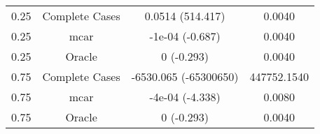 \begin{table}[ht]
\centering
\begin{tabular}{cccc}
  \hline
  \hline
0.25 & Complete Cases & 0.0514 (514.417) & 0.0040 \\ 
  0.25 & mcar & -1e-04 (-0.687) & 0.0040 \\ 
  0.25 & Oracle & 0 (-0.293) & 0.0040 \\ 
  0.75 & Complete Cases & -6530.065 (-65300650) & 447752.1540 \\ 
  0.75 & mcar & -4e-04 (-4.338) & 0.0080 \\ 
  0.75 & Oracle & 0 (-0.293) & 0.0040 \\ 
   \hline
\end{tabular}
\end{table}
